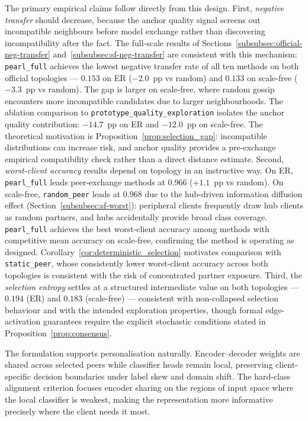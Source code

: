 \documentclass[conference]{IEEEtran}
\newcommand{\rev}[1]{{\color{red}#1}}
\begin{document}
The primary empirical claims follow directly from this design. First, \emph{negative transfer} should decrease, because the anchor quality signal screens out incompatible neighbours before model exchange rather than discovering incompatibility after the fact. \rev{The full-scale results of Sections~\ref{subsubsec:official-neg-transfer} and~\ref{subsubsec:sf-neg-transfer} are consistent with this mechanism:} \texttt{pearl\_full} achieves the lowest negative transfer rate of all ten methods on both official topologies --- $0.153$ on ER ($-2.0$~pp vs random) and $0.133$ on scale-free ($-3.3$~pp vs random). The gap is larger on scale-free, where random gossip encounters more incompatible candidates due to larger neighbourhoods. The ablation comparison to \texttt{prototype\_quality\_exploration} isolates the anchor quality contribution: $-14.7$~pp on ER and $-12.0$~pp on scale-free. \rev{The theoretical motivation is Proposition~\ref{prop:selection_gap}: incompatible distributions can increase risk, and anchor quality provides a pre-exchange empirical compatibility check rather than a direct distance estimate.} Second, \emph{worst-client accuracy} results depend on topology in an instructive way. On ER, \texttt{pearl\_full} leads peer-exchange methods at $0.966$ ($+1.1$~pp vs random). On scale-free, \texttt{random\_peer} leads at $0.968$ due to the hub-driven information diffusion effect (Section~\ref{subsubsec:sf-worst}): peripheral clients frequently draw hub clients as random partners, and hubs accidentally provide broad class coverage. \texttt{pearl\_full} achieves the best worst-client accuracy among methods with competitive mean accuracy on scale-free, confirming the method is operating as designed. \rev{Corollary~\ref{cor:deterministic_selection} motivates comparison with \texttt{static\_peer}, whose consistently lower worst-client accuracy across both topologies is consistent with the risk of concentrated partner exposure.} Third, the \emph{selection entropy} settles at a structured intermediate value on both topologies --- $0.194$ (ER) and $0.183$ (scale-free) --- \rev{consistent with non-collapsed selection behaviour and with the intended exploration properties, though formal edge-activation guarantees require the explicit stochastic conditions stated in Proposition~\ref{prop:consensus}.}

The formulation supports personalisation naturally. Encoder--decoder weights are shared across selected peers while classifier heads remain local, preserving client-specific decision boundaries under label skew and domain shift. The hard-class alignment criterion focuses encoder sharing on the regions of input space where the local classifier is weakest, making the representation more informative precisely where the client needs it most.
\end{document}
